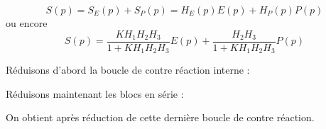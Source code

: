 \[
    S(p)=S_E(p)+S_P(p)=H_E(p)E(p) + H_P(p)P(p)
\]
ou encore
\[
    S(p)=\dfrac{KH_1H_2H_3}{1+KH_1H_2H_3}E(p)+\dfrac{H_2H_3}{1+KH_1H_2H_3} P(p)
\]
\begin{center} 
    
\end{center}
Réduisons d'abord la boucle de contre réaction interne :
\begin{center}
    
\end{center}
Réduisons maintenant les blocs en série :
\begin{center}
    
\end{center}
On obtient après réduction de cette dernière boucle de contre réaction.
\begin{center}
    
\end{center}
